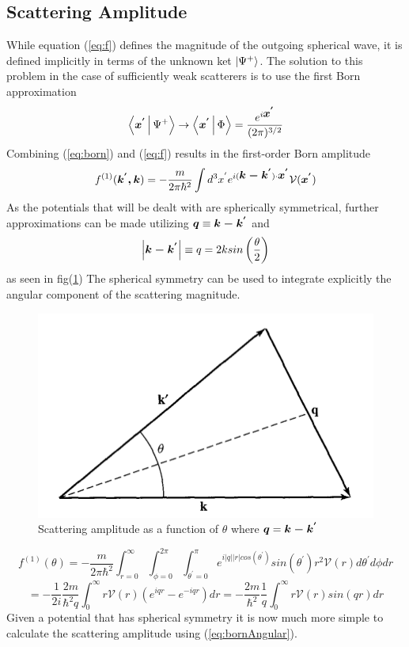 \subsection{Scattering Amplitude}
While equation (\ref{eq:f}) defines the magnitude of the outgoing spherical wave, it is defined implicitly in terms of the unknown ket $\Ket{\Psi^{+}}$. The solution to this problem in the case of sufficiently weak scatterers is to use the first Born approximation 
\begin{equation}
\label{eq:born}
\Braket{\mbox{\boldmath$x^{'}$}|\Psi^{+}} \rightarrow \Braket{\mbox{\boldmath$x^{'}$}| \Phi} = \frac{e^{i\mbox{\boldmath$x^{'}$}}}{(2\pi)^{3/2}}
\end{equation}
Combining (\ref{eq:born}) and (\ref{eq:f}) results in the first-order Born amplitude 
\begin{equation}
\label{eq:firstOrderBorn}
f^{(1)}(\mbox{\boldmath$k^{'},k$}) = -\frac{m}{2\pi\hbar^2}\int d^3x^{'}e^{i(\mbox{\boldmath$k-k^{'}$})\cdot \mbox{\boldmath$x^{'}$}}\mathcal{V}(\mbox{\boldmath$x^{'}$})
\end{equation}
As the potentials that will be dealt with are spherically symmetrical, further approximations can be made utilizing $\mbox{\boldmath$q$} \equiv \mbox{\boldmath$k-k^{'}$}$ and $$\left|\mbox{\boldmath$k-k^{'}$}\right| \equiv  q = 2ksin \left( \frac{\theta}{2}\right)$$ as seen in fig(\ref{fig:scatteringAngle}) The spherical symmetry can be used to integrate explicitly the angular component of the scattering magnitude. 
\begin{figure}[ht!]
\centering
\includegraphics[scale=0.5]{Figures/scatteringAngle.png}
\caption{Scattering amplitude as a function of $\theta$ where $\mbox{\boldmath$q$}=\mbox{\boldmath$k-k^{'}$}$ }
\label{fig:scatteringAngle}
\end{figure}
$$
f^{(1)}(\theta) =  -\frac{m}{2\pi\hbar^2} \int_{r=0}^{\infty} \int_{\phi=0}^{2\pi} \int_{\theta^{'}=0}^{\pi} e^{i \left| q \right| \left| r \right|cos(\theta^{'})}sin(\theta^{'})r^2 \mathcal{V}(r) d\theta^{'} d\phi dr
$$
\begin{equation}
\label{eq:bornAngular}
= -\frac{1}{2i}\frac{2m}{\hbar^2q} \int_{0}^{\infty} r\mathcal{V}(r)(e^{iqr}-e^{-iqr})dr = -\frac{2m}{\hbar^2}\frac{1}{q}\int_{0}^{\infty} r\mathcal{V}(r)sin(qr)dr
\end{equation}
Given a potential that has spherical symmetry it is now much more simple to calculate the scattering amplitude using (\ref{eq:bornAngular}).
